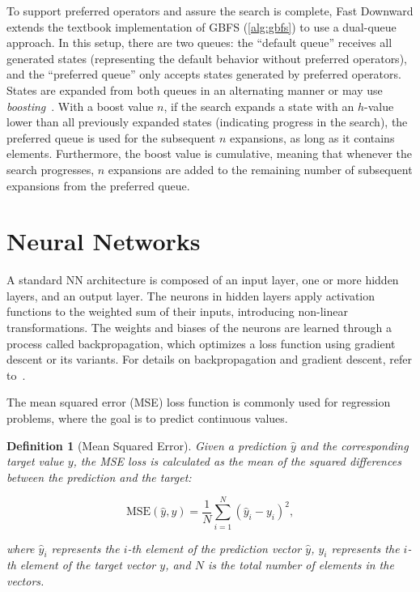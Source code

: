\documentclass[ppgc,diss,english]{iiufrgs}
\newtheorem{definition}{Definition}
\begin{document}
To support preferred operators and assure the search is complete, Fast Downward extends the textbook implementation of GBFS (\cref{alg:gbfs}) to use a dual-queue approach. In this setup, there are two queues: the ``default queue'' receives all generated states (representing the default behavior without preferred operators), and the ``preferred queue'' only accepts states generated by preferred operators. States are expanded from both queues in an alternating manner or may use \emph{boosting}~\cite{Richter.Helmert/2009}. With a boost value $n$, if the search expands a state with an $h$-value lower than all previously expanded states (indicating progress in the search), the preferred queue is used for the subsequent $n$ expansions, as long as it contains elements. Furthermore, the boost value is cumulative, meaning that whenever the search progresses, $n$ expansions are added to the remaining number of subsequent expansions from the preferred queue.

\section{Neural Networks}
\label{sec:background-neural-nets}
A standard NN architecture is composed of an input layer, one or more hidden layers, and an output layer. The neurons in hidden layers apply activation functions to the weighted sum of their inputs, introducing non-linear transformations. The weights and biases of the neurons are learned through a process called backpropagation, which optimizes a loss function using gradient descent or its variants. For details on backpropagation and gradient descent, refer to~\citet{Goodfellow.etal/2016}.

The mean squared error (MSE) loss function is commonly used for regression problems, where the goal is to predict continuous values.
\begin{definition}[Mean Squared Error]\label{def:mse}
Given a prediction $\hat{y}$ and the corresponding target value $y$, the MSE loss is calculated as the mean of the squared differences between the prediction and the target:

$$\text{MSE}(\hat{y}, y) = \frac{1}{N} \sum_{i=1}^{N} (\hat{y}_i - y_i)^2,$$

where $\hat{y}_i$ represents the $i$-th element of the prediction vector $\hat{y}$, $y_i$ represents the $i$-th element of the target vector $y$, and $N$ is the total number of elements in the vectors.
\end{definition}
\end{document}
